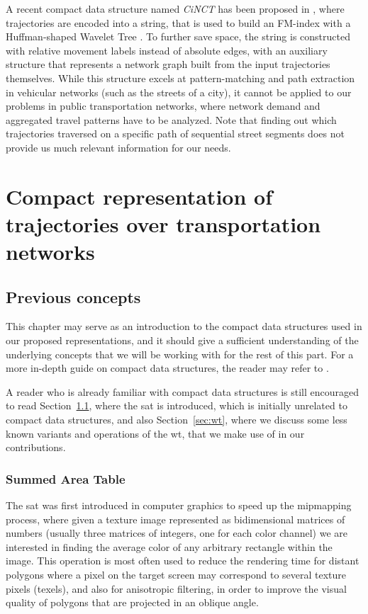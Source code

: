 \documentclass[a4paper,10pt,twoside]{book}
\begin{document}
    
    A recent compact data structure named {\em CiNCT} has been proposed in \cite{koide2018cinct}, where trajectories are encoded into a string, that is used to build an FM-index \cite{DBLP:conf/focs/FerraginaM00} with a Huffman-shaped Wavelet Tree \cite{ferragina2009compressed}. To further save space, the string is constructed with relative movement labels instead of absolute edges, with an auxiliary structure that represents a network graph built from the input trajectories themselves. While this structure excels at pattern-matching and path extraction in vehicular networks (such as the streets of a city), it cannot be applied to our problems in public transportation networks, where network demand and aggregated travel patterns have to be analyzed. Note that finding out which trajectories traversed on a specific path of sequential street segments does not provide us much relevant information for our needs.
	
	
\part{Compact representation of trajectories over transportation networks} \label{part:cds}
\chapter{Previous concepts}
\label{ch:cds:prev}
	This chapter may serve as an introduction to the compact data structures used in our proposed representations, and it should give a sufficient understanding of the underlying concepts that we will be working with for the rest of this part. For a more in-depth guide on compact data structures, the reader may refer to \cite{Nav16}.
	
	A reader who is already familiar with compact data structures is still encouraged to read Section~\ref{sec:sat}, where the \gls{sat} is introduced, which is initially unrelated to compact data structures, and also Section~\ref{sec:wt}, where we discuss some less known variants and operations of the \gls{wt}, that we make use of in our contributions.
	
	\section{Summed Area Table}
	\label{sec:sat}
	The \gls{sat} was first introduced in computer graphics \cite{crow1984summed} to speed up the mipmapping process, where given a texture image represented as bidimensional matrices of numbers (usually three matrices of integers, one for each color channel) we are interested in finding the average color of any arbitrary rectangle within the image. This operation is most often used to reduce the rendering time for distant polygons where a pixel on the target screen may correspond to several texture pixels (texels), and also for anisotropic filtering, in order to improve the visual quality of polygons that are projected in an oblique angle.
\end{document}
